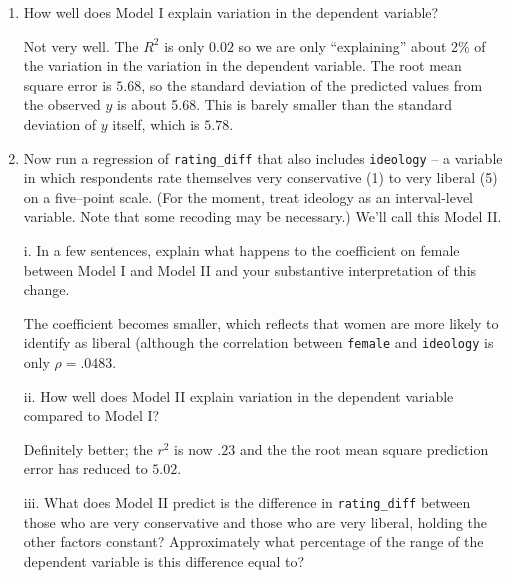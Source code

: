 \documentclass[12pt]{article}
\begin{document}
\begin{enumerate}
\vspace{4mm}
\vspace{4mm}

\item How well does Model I explain variation in the dependent variable? \\

\vspace{4mm}

Not very well. The $R^2$ is only $0.02$ so we are only ``explaining'' about 2\% of the variation in the variation in the dependent variable.  The root mean square error is $5.68$, so the standard deviation of the predicted values from the observed $y$ is about 5.68. This is barely smaller than the standard deviation of $y$ itself, which is $5.78$.

\vspace{4mm}

\item Now run a regression of \verb+rating_diff+ that also includes \verb|ideology| -- a variable in which respondents rate themselves very conservative (1) to very liberal (5) on a five--point scale. (For the moment, treat ideology as an interval-level variable. Note that some recoding may be necessary.) We'll call this Model II.\\
\vspace{4mm}

i. In a few sentences, explain what happens to the coefficient on female between Model I and Model II and your substantive interpretation of this change.\\
\vspace{4mm}

The coefficient becomes smaller, which reflects that women are more likely to identify as liberal (although the correlation between \verb|female| and \verb|ideology| is only $\rho = .0483$.

\vspace{4mm}
ii. How well does Model II explain variation in the dependent variable compared to Model I?\\
\vspace{4mm}

Definitely better; the $r^2$ is now $.23$ and the the root mean square prediction error has reduced to $5.02$.

\vspace{4mm}
iii. What does Model II predict is the difference in \verb|rating_diff| between those who are very conservative and those who are very liberal, holding the other factors constant? Approximately what percentage of the range of the dependent variable is this difference equal to?


\end{enumerate}
\end{document}
